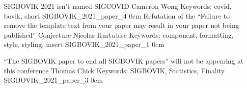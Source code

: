 \addpaper
    {SIGBOVIK 2021 isn't named SIGCOVID}
    {Cameron Wong}
    {Keywords: covid, bovik, short}
    {SIGBOVIK_2021_paper_4}
    {0cm}
    {}
\addpaper
    {Refutation of the “Failure to remove the template text from your paper may result in your paper not being published” Conjecture}
    {Nicolas Hurtubise} %
    {Keywords: component, formatting, style, styling, insert}
    {SIGBOVIK_2021_paper_1}
    {0cm}
    {}


\addpaper
    {``The SIGBOVIK paper to end all SIGBOVIK papers'' will not be appearing at this conference}
    {Thomas Chick}
    {Keywords: SIGBOVIK, Statistics, Finality}
    {SIGBOVIK_2021_paper_3}
    {0cm}
    {}

